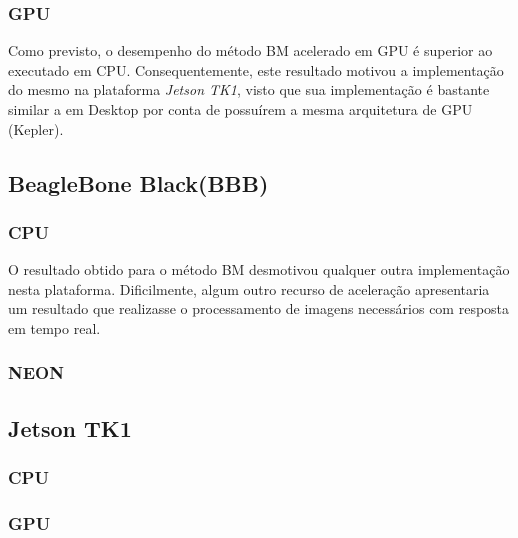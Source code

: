 \subsubsection{GPU}

Como previsto, o desempenho do método BM acelerado em GPU é superior ao executado em CPU. Consequentemente, este resultado motivou a implementação do mesmo na plataforma \textit{Jetson TK1}, visto que sua implementação é bastante similar a em Desktop por conta de possuírem a mesma arquitetura de GPU (Kepler).  

\subsection{BeagleBone Black(BBB)}
\subsubsection{CPU}

O resultado obtido para o método BM desmotivou qualquer outra implementação nesta plataforma. Dificilmente, algum outro recurso de aceleração apresentaria um resultado que realizasse o processamento de imagens necessários com resposta em tempo real. 

\subsubsection{NEON}


\subsection{Jetson TK1}
\subsubsection{CPU}
\subsubsection{GPU}